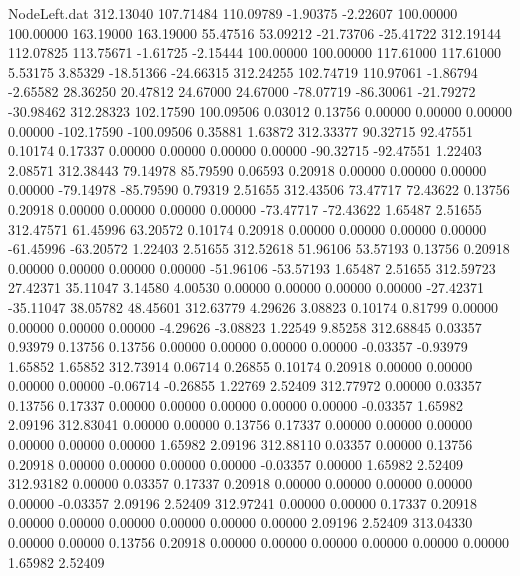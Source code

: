 \begin{filecontents}{NodeLeft.dat}
 312.13040  107.71484  110.09789    -1.90375   -2.22607  100.00000  100.00000  163.19000  163.19000   55.47516   53.09212  -21.73706  -25.41722
 312.19144  112.07825  113.75671    -1.61725   -2.15444  100.00000  100.00000  117.61000  117.61000    5.53175    3.85329  -18.51366  -24.66315
 312.24255  102.74719  110.97061    -1.86794   -2.65582   28.36250   20.47812   24.67000   24.67000  -78.07719  -86.30061  -21.79272  -30.98462
 312.28323  102.17590  100.09506     0.03012    0.13756    0.00000    0.00000    0.00000    0.00000 -102.17590 -100.09506    0.35881    1.63872
 312.33377   90.32715   92.47551     0.10174    0.17337    0.00000    0.00000    0.00000    0.00000  -90.32715  -92.47551    1.22403    2.08571
 312.38443   79.14978   85.79590     0.06593    0.20918    0.00000    0.00000    0.00000    0.00000  -79.14978  -85.79590    0.79319    2.51655
 312.43506   73.47717   72.43622     0.13756    0.20918    0.00000    0.00000    0.00000    0.00000  -73.47717  -72.43622    1.65487    2.51655
 312.47571   61.45996   63.20572     0.10174    0.20918    0.00000    0.00000    0.00000    0.00000  -61.45996  -63.20572    1.22403    2.51655
 312.52618   51.96106   53.57193     0.13756    0.20918    0.00000    0.00000    0.00000    0.00000  -51.96106  -53.57193    1.65487    2.51655
 312.59723   27.42371   35.11047     3.14580    4.00530    0.00000    0.00000    0.00000    0.00000  -27.42371  -35.11047   38.05782   48.45601
 312.63779    4.29626    3.08823     0.10174    0.81799    0.00000    0.00000    0.00000    0.00000   -4.29626   -3.08823    1.22549    9.85258
 312.68845    0.03357    0.93979     0.13756    0.13756    0.00000    0.00000    0.00000    0.00000   -0.03357   -0.93979    1.65852    1.65852
 312.73914    0.06714    0.26855     0.10174    0.20918    0.00000    0.00000    0.00000    0.00000   -0.06714   -0.26855    1.22769    2.52409
 312.77972    0.00000    0.03357     0.13756    0.17337    0.00000    0.00000    0.00000    0.00000    0.00000   -0.03357    1.65982    2.09196
 312.83041    0.00000    0.00000     0.13756    0.17337    0.00000    0.00000    0.00000    0.00000    0.00000    0.00000    1.65982    2.09196
 312.88110    0.03357    0.00000     0.13756    0.20918    0.00000    0.00000    0.00000    0.00000   -0.03357    0.00000    1.65982    2.52409
 312.93182    0.00000    0.03357     0.17337    0.20918    0.00000    0.00000    0.00000    0.00000    0.00000   -0.03357    2.09196    2.52409
 312.97241    0.00000    0.00000     0.17337    0.20918    0.00000    0.00000    0.00000    0.00000    0.00000    0.00000    2.09196    2.52409
 313.04330    0.00000    0.00000     0.13756    0.20918    0.00000    0.00000    0.00000    0.00000    0.00000    0.00000    1.65982    2.52409

\end{filecontents}

